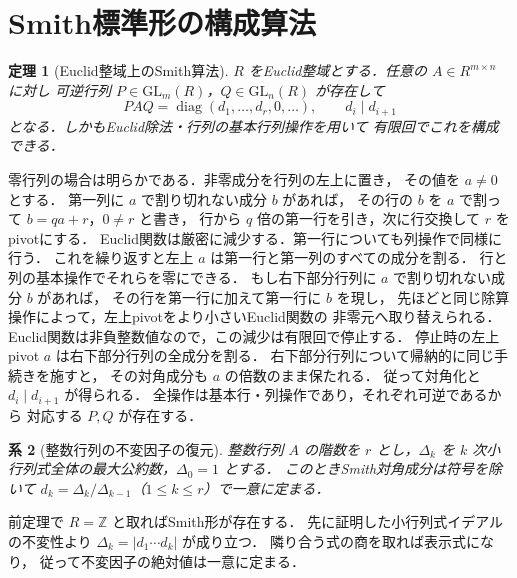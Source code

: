 \documentclass[a5paper,10pt,onecolumn]{jsarticle}
\makeatletter
\theoremstyle{mathnotetheorem}
\newtheorem{theorem}{定理}[section]
\newtheorem{corollary}[theorem]{系}
\renewcommand{\proofname}{証明}
\renewenvironment{proof}[1][\proofname]{%
  \par\pushQED{\qed}\normalfont\topsep4\p@\@plus2\p@\relax
  \trivlist\item[\hskip\labelsep\bfseries #1]\ignorespaces
}{\popQED\endtrivlist\@endpefalse}
\makeatother
\begin{document}
\section{Smith標準形の構成算法}
\begin{theorem}[Euclid整域上のSmith算法]
$R$ をEuclid整域とする．任意の $A\in R^{m\times n}$ に対し
可逆行列 $P\in\mathrm{GL}_m(R)$，$Q\in\mathrm{GL}_n(R)$ が存在して
\[
 PAQ=\operatorname{diag}(d_1,\ldots,d_r,0,\ldots),
 \qquad d_i\mid d_{i+1}
\]
となる．しかもEuclid除法・行列の基本行列操作を用いて
有限回でこれを構成できる．
\end{theorem}
\begin{proof}
零行列の場合は明らかである．非零成分を行列の左上に置き，
その値を $a\ne0$ とする．
第一列に $a$ で割り切れない成分 $b$ があれば，
その行の $b$ を $a$ で割って $b=qa+r$，$0\ne r$ と書き，
行から $q$ 倍の第一行を引き，次に行交換して $r$ をpivotにする．
Euclid関数は厳密に減少する．第一行についても列操作で同様に行う．
これを繰り返すと左上 $a$ は第一行と第一列のすべての成分を割る．
行と列の基本操作でそれらを零にできる．
もし右下部分行列に $a$ で割り切れない成分 $b$ があれば，
その行を第一行に加えて第一行に $b$ を現し，
先ほどと同じ除算操作によって，左上pivotをより小さいEuclid関数の
非零元へ取り替えられる．
Euclid関数は非負整数値なので，この減少は有限回で停止する．
停止時の左上pivot $a$ は右下部分行列の全成分を割る．
右下部分行列について帰納的に同じ手続きを施すと，
その対角成分も $a$ の倍数のまま保たれる．
従って対角化と $d_i\mid d_{i+1}$ が得られる．
全操作は基本行・列操作であり，それぞれ可逆であるから
対応する $P,Q$ が存在する．
\end{proof}
\begin{corollary}[整数行列の不変因子の復元]
整数行列 $A$ の階数を $r$ とし，$\Delta_k$ を
$k$ 次小行列式全体の最大公約数，$\Delta_0=1$ とする．
このときSmith対角成分は符号を除いて
$ d_k=\Delta_k/\Delta_{k-1}$（$1\le k\le r$）で一意に定まる．
\end{corollary}
\begin{proof}
前定理で $R=\mathbb Z$ と取ればSmith形が存在する．
先に証明した小行列式イデアルの不変性より
$\Delta_k=|d_1\cdots d_k|$ が成り立つ．
隣り合う式の商を取れば表示式になり，
従って不変因子の絶対値は一意に定まる．
\end{proof}
\end{document}
